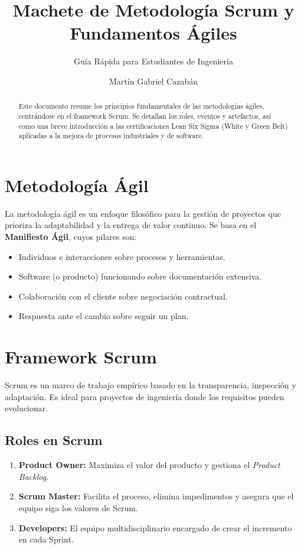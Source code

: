 \documentclass[runningheads]{llncs}
\begin{document}
\title{Machete de Metodología Scrum y Fundamentos Ágiles}
\subtitle{Guía Rápida para Estudiantes de Ingeniería}

\author{Martín Gabriel Cazabán}

\maketitle

\begin{abstract}
Este documento resume los principios fundamentales de las metodologías ágiles, centrándose en el framework Scrum. Se detallan los roles, eventos y artefactos, así como una breve introducción a las certificaciones Lean Six Sigma (White y Green Belt) aplicadas a la mejora de procesos industriales y de software.

\end{abstract}

\section{Metodología Ágil}
La metodología ágil es un enfoque filosófico para la gestión de proyectos que prioriza la adaptabilidad y la entrega de valor continuo. Se basa en el \textbf{Manifiesto Ágil}, cuyos pilares son:
\begin{itemize}
    \item Individuos e interacciones sobre procesos y herramientas.
    \item Software (o producto) funcionando sobre documentación extensiva.
    \item Colaboración con el cliente sobre negociación contractual.
    \item Respuesta ante el cambio sobre seguir un plan.
\end{itemize}

\section{Framework Scrum}
Scrum es un marco de trabajo empírico basado en la transparencia, inspección y adaptación. Es ideal para proyectos de ingeniería donde los requisitos pueden evolucionar.

\subsection{Roles en Scrum}
\begin{enumerate}
    \item \textbf{Product Owner:} Maximiza el valor del producto y gestiona el \textit{Product Backlog}.
    \item \textbf{Scrum Master:} Facilita el proceso, elimina impedimentos y asegura que el equipo siga los valores de Scrum.
    \item \textbf{Developers:} El equipo multidisciplinario encargado de crear el incremento en cada Sprint.
\end{enumerate}
\end{document}
